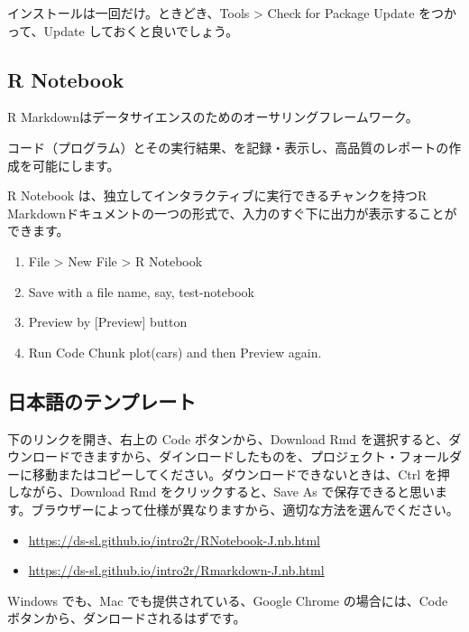 \documentclass[
]{bxjsbook}
\providecommand{\tightlist}{%
  \setlength{\itemsep}{0pt}\setlength{\parskip}{0pt}}
\theoremstyle{definition}
\theoremstyle{definition}
\theoremstyle{definition}
\theoremstyle{definition}
\theoremstyle{remark}
\begin{document}
インストールは一回だけ。ときどき、Tools \textgreater{} Check for Package Update をつかって、Update しておくと良いでしょう。

\hypertarget{r-notebook}{%
\subsection{R Notebook}\label{r-notebook}}

R Markdownはデータサイエンスのためのオーサリングフレームワーク。

コード（プログラム）とその実行結果、を記録・表示し、高品質のレポートの作成を可能にします。

R Notebook は、独立してインタラクティブに実行できるチャンクを持つR Markdownドキュメントの一つの形式で、入力のすぐ下に出力が表示することができます。

\begin{enumerate}
\def\labelenumi{\arabic{enumi}.}
\tightlist
\item
  File \textgreater{} New File \textgreater{} R Notebook
\item
  Save with a file name, say, test-notebook
\item
  Preview by {[}Preview{]} button
\item
  Run Code Chunk plot(cars) and then Preview again.
\end{enumerate}

\hypertarget{ux65e5ux672cux8a9eux306eux30c6ux30f3ux30d7ux30ecux30fcux30c8}{%
\subsection{日本語のテンプレート}\label{ux65e5ux672cux8a9eux306eux30c6ux30f3ux30d7ux30ecux30fcux30c8}}

下のリンクを開き、右上の Code ボタンから、Download Rmd を選択すると、ダウンロードできますから、ダインロードしたものを、プロジェクト・フォールダーに移動またはコピーしてください。ダウンロードできないときは、Ctrl を押しながら、Download Rmd をクリックすると、Save As で保存できると思います。ブラウザーによって仕様が異なりますから、適切な方法を選んでください。

\begin{itemize}
\tightlist
\item
  \url{https://ds-sl.github.io/intro2r/RNotebook-J.nb.html}
\item
  \url{https://ds-sl.github.io/intro2r/Rmarkdown-J.nb.html}
\end{itemize}

Windows でも、Mac でも提供されている、Google Chrome の場合には、Code ボタンから、ダンロードされるはずです。
\end{document}
